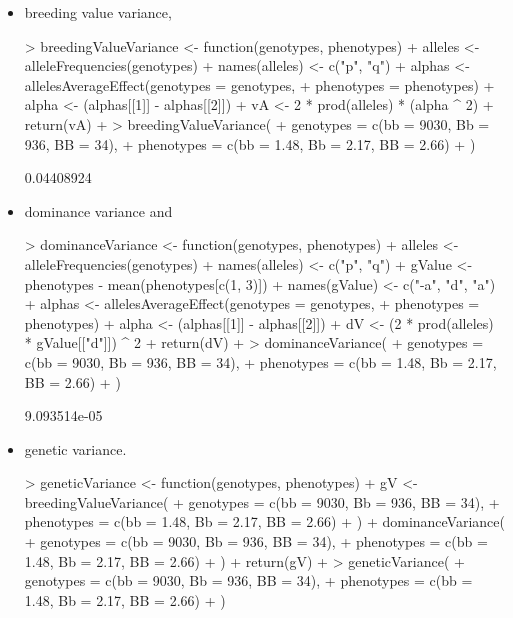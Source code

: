 \documentclass[12pt,a4paper]{paper}
\begin{document}
\begin{enumerate}
\begin{enumerate}
\begin{itemize}
\begin{Schunk}
\end{Schunk}
\item breeding value variance,
\begin{Schunk}
\begin{Sinput}
> breedingValueVariance <- function(genotypes, phenotypes){
+   alleles <- alleleFrequencies(genotypes)
+   names(alleles) <- c("p", "q")
+   alphas <- allelesAverageEffect(genotypes = genotypes,
+   phenotypes = phenotypes)
+   alpha <- (alphas[[1]] - alphas[[2]])
+   vA <- 2 * prod(alleles) * (alpha ^ 2)
+   return(vA)
+ }
> breedingValueVariance(
+ genotypes = c(bb = 9030, Bb = 936, BB = 34),
+ phenotypes = c(bb = 1.48, Bb = 2.17, BB = 2.66)
+ )
\end{Sinput}
\begin{Soutput}
[1] 0.04408924
\end{Soutput}
\end{Schunk}
\item dominance variance and 
\begin{Schunk}
\begin{Sinput}
> dominanceVariance <- function(genotypes, phenotypes){
+   alleles <- alleleFrequencies(genotypes)
+   names(alleles) <- c("p", "q")
+   gValue <- phenotypes - mean(phenotypes[c(1, 3)])
+   names(gValue) <- c("-a", "d", "a")
+   alphas <- allelesAverageEffect(genotypes = genotypes,
+   phenotypes = phenotypes)
+   alpha <- (alphas[[1]] - alphas[[2]])
+   dV <- (2 * prod(alleles) * gValue[["d"]]) ^ 2
+   return(dV)
+ }
> dominanceVariance(
+ genotypes = c(bb = 9030, Bb = 936, BB = 34),
+ phenotypes = c(bb = 1.48, Bb = 2.17, BB = 2.66)
+ )
\end{Sinput}
\begin{Soutput}
[1] 9.093514e-05
\end{Soutput}
\end{Schunk}
\item genetic variance.
\begin{Schunk}
\begin{Sinput}
> geneticVariance <- function(genotypes, phenotypes){
+   gV <- breedingValueVariance(
+     genotypes = c(bb = 9030, Bb = 936, BB = 34),
+     phenotypes = c(bb = 1.48, Bb = 2.17, BB = 2.66)
+   ) + dominanceVariance(
+     genotypes = c(bb = 9030, Bb = 936, BB = 34),
+     phenotypes = c(bb = 1.48, Bb = 2.17, BB = 2.66)
+   )
+   return(gV)
+ }
> geneticVariance(
+ genotypes = c(bb = 9030, Bb = 936, BB = 34),
+ phenotypes = c(bb = 1.48, Bb = 2.17, BB = 2.66)
+ )
\end{Sinput}
\begin{Soutput}

\end{Soutput}
\end{Schunk}
\end{itemize}
\end{enumerate}
\end{enumerate}
\end{document}
